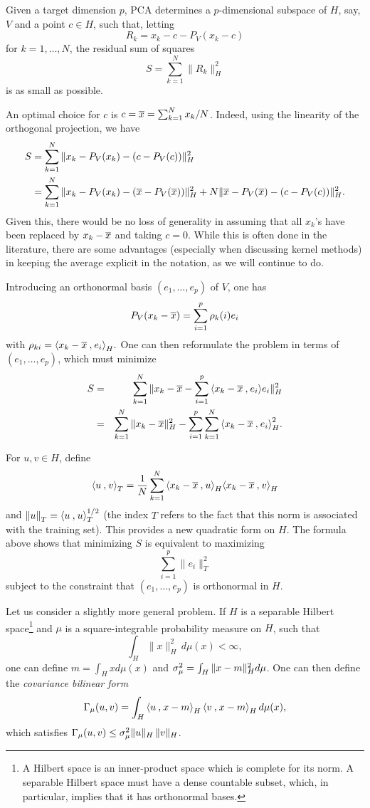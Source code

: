 Given a target dimension $p$, PCA determines a $p$-dimensional subspace of $H$, say, $V$ and a point $c\in H$, such that, letting
\[
R_k = x_k - c - P_V(x_k-c)
\]
for $k = 1, \ldots, N$, the residual sum of squares
\begin{equation}
\label{eq:pca.res}
S = \sum_{k=1}^N \|R_k\|^2_H
\end{equation}
is as small as possible. 

An optimal choice for $c$ is 
$c = \overline{x} = \sum_{k=1}^N x_k/N$.
Indeed, using the linearity of the orthogonal projection, we have
\begin{align*}
S &= \sum_{k=1}^N \|x_k - P_V(x_k) - (c-P_V(c))\|^2_H \\
& = \sum_{k=1}^N \|x_k - P_V(x_k) - (\overline{x}-P_V(\overline{x}))\|^2_H + N  \|\overline{x} - P_V(\overline{x}) - (c-P_V(c))\|^2_H.
\end{align*}
Given this, there would be no loss of generality in assuming that all $x_k$'s
have been replaced by $x_k-\overline{x}$ and taking $c=0$. While this is often done in the literature, there are some advantages (especially when discussing kernel methods) in  keeping the average explicit in the notation, as we will continue to do. 


Introducing an orthonormal basis $(e_1, \ldots, e_p)$ of $V$, one has 
\[
P_V(x_k - \overline{x}) = \sum_{i=1}^p \rho_{k}(i)
e_i
\]
with 
$\rho_{ki} = {\langle {x_k-\overline{x}}\mathbin{,} {e_i}\rangle}_H.$
One can then reformulate the problem in terms of $(e_1, \ldots, e_p)$, which  must minimize
\begin{eqnarray*}
S &=& \sum_{k=1}^N \|x_k-\overline{x} - \sum_{i=1}^p {\langle {x_k-\overline{x}}\mathbin{,} {e_i}\rangle} e_i\|_H^2\\
& =& \sum_{k=1}^N \|x_k-\overline{x}\|_H^2 - \sum_{i=1}^p \sum_{k=1}^N
{\langle {x_k-\overline{x}}\mathbin{,} {e_i}\rangle}^2_H.
\end{eqnarray*}

For $u, v \in H$, define
$$
{\langle {u}\mathbin{,} {v}\rangle}_T = \frac{1}{N} \sum_{k=1}^N {\langle {x_k-\overline{x}}\mathbin{,} {u}\rangle}_H{\langle {x_k-\overline{x}}\mathbin{,} {v}\rangle}_H
$$
and $\left\| u \right\|_T = {\langle {u}\mathbin{,} {u}\rangle}_T^{1/2}$ (the index $T$ refers to the
fact that this norm is associated with the training set). This provides a new quadratic
form on $H$. The formula above shows that minimizing $S$  is equivalent
to maximizing
$$
\sum_{i=1}^p \|e_i\|^2_T
$$ 
subject to the constraint that $(e_1, \ldots, e_p)$ is orthonormal in $H$.\bigskip


Let us consider a slightly more general problem. If $H$ is a separable Hilbert space\footnote{A Hilbert space is an inner-product space which is complete for its norm. A separable Hilbert space must have a dense countable subset, which, in particular, implies that it has orthonormal bases.}
 and $\mu$ is a square-integrable probability measure on $H$, such that 
\[
\int_H \|x\|^2_H\, d\mu(x)<\infty,
\]
one can define $m = \int_H x d\mu(x)$ and $\sigma_\mu^2 = \int_H \|x-m\|^2_H d\mu$. 
One can then define the {\em covariance bilinear form}
\[
\Gamma_\mu(u,v) = \int_H {\langle {u}\mathbin{,} {x-m}\rangle}_H\, {\langle {v}\mathbin{,} {x-m}\rangle}_H\, d\mu(x),
\]
which satisfies $\Gamma_\mu(u,v) \leq \sigma_\mu^2 \|u\|_H\,\|v\|_H$. 

